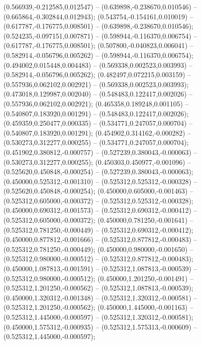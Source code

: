  (0.566939,-0.212585,0.012547) -- (0.639898,-0.238670,0.010546) -- (0.665864,-0.302844,0.012943);
 (0.543754,-0.154161,0.010019) -- (0.617787,-0.176775,0.008501) -- (0.639898,-0.238670,0.010546);
 (0.524235,-0.097151,0.007871) -- (0.598944,-0.116370,0.006754) -- (0.617787,-0.176775,0.008501);
 (0.507800,-0.040823,0.006041) -- (0.582914,-0.056796,0.005262) -- (0.598944,-0.116370,0.006754);
 (0.494002,0.015448,0.004483) -- (0.569338,0.002523,0.003993) -- (0.582914,-0.056796,0.005262);
 (0.482497,0.072215,0.003159) -- (0.557936,0.062102,0.002921) -- (0.569338,0.002523,0.003993);
 (0.473018,0.129987,0.002040) -- (0.548483,0.122417,0.002026) -- (0.557936,0.062102,0.002921);
 (0.465358,0.189248,0.001105) -- (0.540807,0.183920,0.001291) -- (0.548483,0.122417,0.002026);
 (0.459359,0.250477,0.000335) -- (0.534771,0.247057,0.000704) -- (0.540807,0.183920,0.001291);
 (0.454902,0.314162,-0.000282) -- (0.530273,0.312277,0.000255) -- (0.534771,0.247057,0.000704);
 (0.451902,0.380812,-0.000757) -- (0.527239,0.380043,-0.000063) -- (0.530273,0.312277,0.000255);
 (0.450303,0.450977,-0.001096) -- (0.525620,0.450848,-0.000254) -- (0.527239,0.380043,-0.000063);
 (0.450000,0.525312,-0.001310) -- (0.525312,0.525312,-0.000328) -- (0.525620,0.450848,-0.000254);
 (0.450000,0.605000,-0.001463) -- (0.525312,0.605000,-0.000372) -- (0.525312,0.525312,-0.000328);
 (0.450000,0.690312,-0.001573) -- (0.525312,0.690312,-0.000412) -- (0.525312,0.605000,-0.000372);
 (0.450000,0.781250,-0.001641) -- (0.525312,0.781250,-0.000449) -- (0.525312,0.690312,-0.000412);
 (0.450000,0.877812,-0.001666) -- (0.525312,0.877812,-0.000483) -- (0.525312,0.781250,-0.000449);
 (0.450000,0.980000,-0.001650) -- (0.525312,0.980000,-0.000512) -- (0.525312,0.877812,-0.000483);
 (0.450000,1.087813,-0.001591) -- (0.525312,1.087813,-0.000539) -- (0.525312,0.980000,-0.000512);
 (0.450000,1.201250,-0.001491) -- (0.525312,1.201250,-0.000562) -- (0.525312,1.087813,-0.000539);
 (0.450000,1.320312,-0.001348) -- (0.525312,1.320312,-0.000581) -- (0.525312,1.201250,-0.000562);
 (0.450000,1.445000,-0.001163) -- (0.525312,1.445000,-0.000597) -- (0.525312,1.320312,-0.000581);
 (0.450000,1.575312,-0.000935) -- (0.525312,1.575313,-0.000609) -- (0.525312,1.445000,-0.000597);
